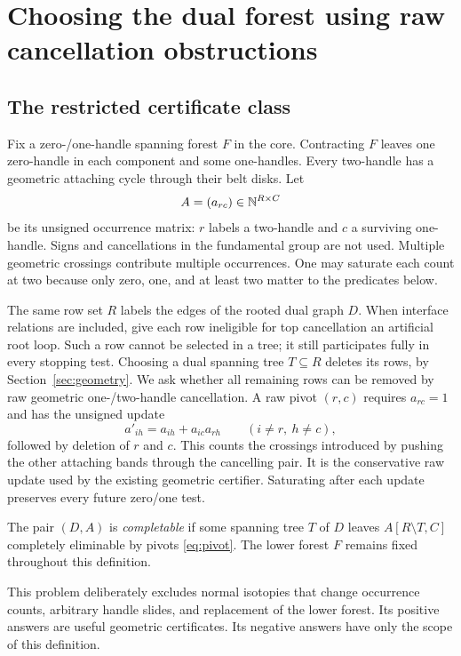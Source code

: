 \section{Choosing the dual forest using raw cancellation obstructions}
\label{sec:forests}

\subsection{The restricted certificate class}
Fix a zero-/one-handle spanning forest $F$ in the core.  Contracting $F$
leaves one zero-handle in each component and some one-handles.  Every
two-handle has a geometric attaching cycle through their belt disks.  Let
\[
          A=(a_{rc})\in\mathbb N^{R\times C}
\]
be its unsigned occurrence matrix: $r$ labels a two-handle and $c$ a
surviving one-handle.  Signs and cancellations in the fundamental group are
not used.  Multiple geometric crossings contribute multiple occurrences.
One may saturate each count at two because only zero, one, and at least two
matter to the predicates below.

The same row set $R$ labels the edges of the rooted dual graph $D$.
When interface relations are included, give each row ineligible for top
cancellation an artificial root loop.  Such a row cannot be selected in
a tree; it still participates fully in every stopping test.
Choosing a dual spanning tree $T\subseteq R$ deletes its rows, by
Section~\ref{sec:geometry}.  We ask whether all remaining rows can be
removed by raw geometric one-/two-handle cancellation.  A raw pivot
$(r,c)$ requires $a_{rc}=1$ and has the unsigned update
\begin{equation}\label{eq:pivot}
       a'_{ih}=a_{ih}+a_{ic}a_{rh}
       \qquad (i\ne r,\ h\ne c),
\end{equation}
followed by deletion of $r$ and $c$.  This counts the crossings introduced
by pushing the other attaching bands through the cancelling pair.  It is
the conservative raw update used by the existing geometric certifier.
Saturating after each update preserves every future zero/one test.

\begin{definition}
The pair $(D,A)$ is \emph{completable} if some spanning tree $T$ of $D$
leaves $A[R\setminus T,C]$ completely eliminable by pivots
\eqref{eq:pivot}.  The lower forest $F$ remains fixed throughout this
definition.
\end{definition}
This problem deliberately excludes normal isotopies that change occurrence
counts, arbitrary handle slides, and replacement of the lower forest.
Its positive answers are useful geometric certificates.  Its negative
answers have only the scope of this definition.

